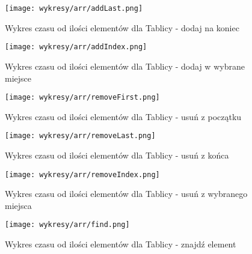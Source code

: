 \documentclass{article}
\begin{document}
    \begin{figure}[H]
        \centering
        \texttt{[image: wykresy/arr/addLast.png]}
        \caption{Wykres czasu od ilości elementów dla Tablicy - dodaj na koniec}
    \end{figure}

    \begin{figure}[H]
        \centering
        \texttt{[image: wykresy/arr/addIndex.png]}
        \caption{Wykres czasu od ilości elementów dla Tablicy - dodaj w wybrane miejsce}
    \end{figure}

    \begin{figure}[H]
        \centering
        \texttt{[image: wykresy/arr/removeFirst.png]}
        \caption{Wykres czasu od ilości elementów dla Tablicy - usuń z początku}
    \end{figure}

    
    \begin{figure}[H]
        \centering
        \texttt{[image: wykresy/arr/removeLast.png]}
        \caption{Wykres czasu od ilości elementów dla Tablicy - usuń z końca}
    \end{figure}
    
    \begin{figure}[H]
        \centering
        \texttt{[image: wykresy/arr/removeIndex.png]}
        \caption{Wykres czasu od ilości elementów dla Tablicy - usuń z wybranego miejsca}
    \end{figure}
    
    \begin{figure}[H]
        \centering
        \texttt{[image: wykresy/arr/find.png]}
        \caption{Wykres czasu od ilości elementów dla Tablicy - znajdź element}
    \end{figure}    
\end{document}
